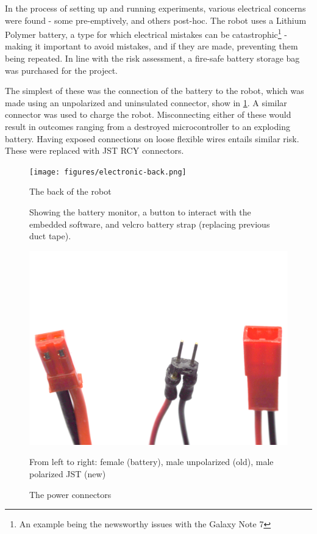 \documentclass[main.tex]{subfiles}
\begin{document}
In the process of setting up and running experiments, various electrical concerns were found - some pre-emptively, and others post-hoc. The robot uses a Lithium Polymer battery, a type for which electrical mistakes can be catastrophic\footnote{An example being the newsworthy \cite{bbc-samsung-explosion} issues with the Galaxy Note 7} - making it important to avoid mistakes, and if they are made, preventing them being repeated. In line with the risk assessment, a fire-safe battery storage bag was purchased for the project.

The simplest of these was the connection of the battery to the robot, which was made using an unpolarized and uninsulated connector, show in \cref{fig:connectors}. A similar connector was used to charge the robot. Misconnecting either of these would result in outcomes ranging from a destroyed microcontroller to an exploding battery. Having exposed connections on loose flexible wires entails similar risk. These were replaced with JST RCY connectors.

\begin{figure}
	\begin{minipage}[t]{0.5\linewidth - 1em}
		\centering
		\texttt{[image: figures/electronic-back.png]}
		\caption{The back of the robot}
		\label{fig:robot-back}
		\medskip
		\small
		Showing the battery monitor, a button to interact with the embedded software, and velcro battery strap
		(replacing previous duct tape).
	\end{minipage}\hfill
	\begin{minipage}[t]{0.5\linewidth - 1em}
		\centering
		\includegraphics[width=\linewidth]{figures/battery-connectors.png}
		\caption{The power connectors}
		\label{fig:connectors}
		\medskip
		\small
		From left to right: female (battery), male unpolarized (old), male polarized JST (new)
	\end{minipage}
\end{figure}
\end{document}
